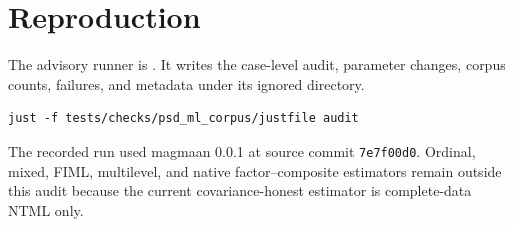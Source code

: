 \documentclass[11pt]{article}
\begin{document}
\section*{Reproduction}

The advisory runner is
.  It writes the
case-level audit, parameter changes, corpus counts, failures, and metadata
under its ignored  directory.

\begin{verbatim}
just -f tests/checks/psd_ml_corpus/justfile audit
\end{verbatim}

The recorded run used magmaan 0.0.1 at source commit
\texttt{7e7f00d0}.  Ordinal, mixed, FIML, multilevel, and native
factor--composite estimators remain outside this audit because the current
covariance-honest estimator is complete-data NTML only.
\end{document}
